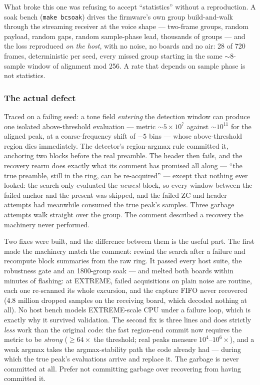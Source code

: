What broke this one was refusing to accept ``statistics'' without a
reproduction.  A soak bench (\texttt{make bcsoak}) drives the
firmware's own group build-and-walk through the streaming receiver at
the voice shape --- two-frame groups, random payload, random gaps,
random sample-phase lead, thousands of groups --- and the loss
reproduced \emph{on the host}, with no noise, no boards and no air:
28 of 720 frames, deterministic per seed, every missed group starting
in the same $\sim$8-sample window of alignment mod 256.  A rate that
depends on sample phase is not statistics.

\subsubsection{The actual defect}
Traced on a failing seed: a tone field \emph{entering} the detection
window can produce one isolated above-threshold evaluation --- metric
$\sim$$5\times10^{7}$ against $\sim$$10^{11}$ for the aligned peak, at
a coarse-frequency shift of $-5$ bins --- whose above-threshold region
dies immediately.  The detector's region-argmax rule committed it,
anchoring two blocks before the real preamble.  The header then fails,
and the recovery rearm does exactly what its comment has promised all
along --- ``the true preamble, still in the ring, can be re-acquired''
--- except that nothing ever looked: the search only evaluated the
\emph{newest} block, so every window between the failed anchor and the
present was skipped, and the failed ZC and header attempts had
meanwhile consumed the true peak's samples.  Three garbage attempts
walk straight over the group.  The comment described a recovery the
machinery never performed.

Two fixes were built, and the difference between them is the useful
part.  The first made the machinery match the comment: rewind the
search after a failure and recompute block summaries from the raw
ring.  It passed every host suite, the robustness gate and an 1800-group
soak --- and melted both boards within minutes of flashing:
at EXTREME, failed acquisitions on plain noise are routine, each one
re-scanned its whole excursion, and the capture FIFO never recovered
(4.8 million dropped samples on the receiving board, which decoded
nothing at all).  No host bench models EXTREME-scale CPU under a
failure loop, which is exactly why it survived validation.  The second
fix is three lines and does strictly \emph{less} work than the
original code: the fast region-end commit now requires the metric to
be \emph{strong} ($\geq 64\times$ the threshold; real peaks measure
$10^{4}$--$10^{6}\times$), and a weak argmax takes the
argmax-stability path the code already had --- during which the true
peak's evaluations arrive and replace it.  The garbage is never
committed at all.  Prefer not committing garbage over recovering from
having committed it.

